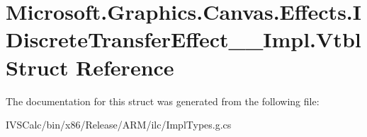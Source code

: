 \hypertarget{struct_microsoft_1_1_graphics_1_1_canvas_1_1_effects_1_1_i_discrete_transfer_effect_____impl_1_1_vtbl}{}\section{Microsoft.\+Graphics.\+Canvas.\+Effects.\+I\+Discrete\+Transfer\+Effect\+\_\+\+\_\+\+Impl.\+Vtbl Struct Reference}
\label{struct_microsoft_1_1_graphics_1_1_canvas_1_1_effects_1_1_i_discrete_transfer_effect_____impl_1_1_vtbl}


The documentation for this struct was generated from the following file\+:\begin{DoxyCompactItemize}
\item 
I\+V\+S\+Calc/bin/x86/\+Release/\+A\+R\+M/ilc/Impl\+Types.\+g.\+cs\end{DoxyCompactItemize}
